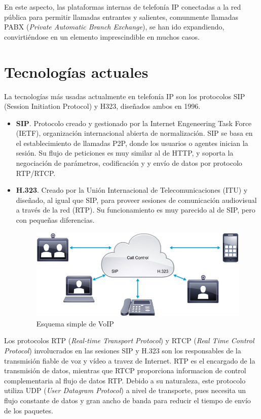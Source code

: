 \documentclass[a4paper, 12pt]{book}
\begin{document}
En este aspecto, las plataformas internas de telefonía IP conectadas a la red pública para permitir llamadas entrantes y salientes, comunmente llamadas PABX (\emph{Private Automatic Branch Exchange}), se han ido expandiendo, convirtiéndose en un elemento imprescindible en muchos casos. 

\section{Tecnologías actuales}
\label{sec:tecnologias-actuales}

La tecnologías más usadas actualmente en telefonía IP son los protocolos SIP (Session Initiation Protocol) y H323, diseñados ambos en 1996.
\begin{itemize}
  \item  \textbf{SIP}. Protocolo creado y gestionado por la Internet Engeneering Task Force (IETF), organización internacional abierta de normalización. SIP se basa en el establecimiento de llamadas P2P, donde los usuarios o agentes inician la sesión. Su flujo de peticiones es muy similar al de HTTP, y soporta la negociación de parámetros, codificación y y envío de datos por protocolo RTP/RTCP.
  \item \textbf{H.323}. Creado por la Unión Internacional de Telecomunicaciones (ITU) y diseñado, al igual que SIP, para proveer sesiones de comunicación audiovisual a través de la red (RTP). Su funcionamiento es muy parecido al de SIP, pero con pequeñas diferencias.
  \\
  \begin{figure}[h]
    \centering
    \includegraphics{img/fig_diagrama_simple_collab}
    \caption{Esquema simple de VoIP}
    \label{figura:fig_diagrama_simple_collab}
  \end{figure}
\end{itemize}

Los protocolos RTP (\emph{Real-time Transport Protocol}) y RTCP (\emph{Real Time Control Protocol}) involucrados en las sesiones SIP y H.323 son los responsables de la transmisión fiable de voz y vídeo a travez de Internet. RTP es el encargado de la transmisión de datos, mientras que RTCP proporciona informacion de control complementaria al flujo de datos RTP. Debido a su naturaleza, este protocolo utiliza UDP (\emph{User Datagram Protocol}) a nivel de transporte, pues necesita un flujo constante de datos y gran ancho de banda para reducir el tiempo de envío de los paquetes.
\end{document}

